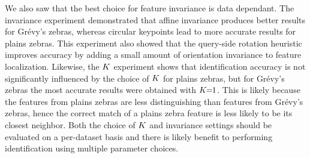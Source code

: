         We also saw that the best choice for feature invariance is data dependant.
        The invariance experiment demonstrated that affine invariance produces better results for Grévy's zebras,
          whereas circular keypoints lead to more accurate results for plains zebras.
        This experiment also showed that the query-side rotation heuristic improves accuracy by adding a small
          amount of orientation invariance to feature localization.
        Likewise, the $K$ experiment shows that identification accuracy is not significantly influenced by the
          choice of $K$ for plains zebras, but for Grévy's zebras the most accurate results were obtained with
          $K\mkern-6mu=\mkern-6mu1$.
        This is likely because the features from plains zebras are less distinguishing than features from Grévy's
          zebras, hence the correct match of a plains zebra feature is less likely to be its closest neighbor.
        Both the choice of $K$ and invariance settings should be evaluated on a per-dataset basis and there is
          likely benefit to performing identification using multiple parameter choices.
